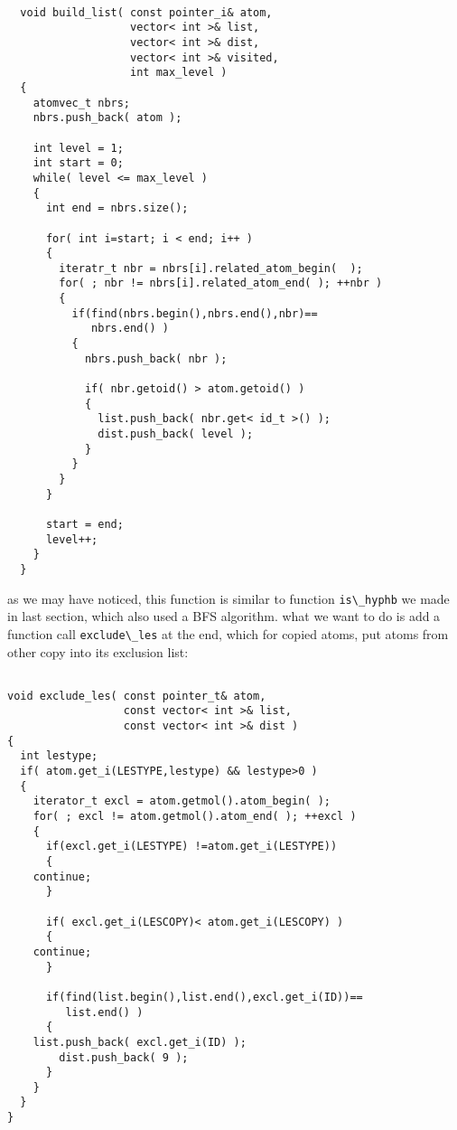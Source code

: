 \documentclass[letterpaper]{book}
\begin{document}
\begin{lstlisting}

  void build_list( const pointer_i& atom, 
                   vector< int >& list, 
                   vector< int >& dist, 
                   vector< int >& visited, 
                   int max_level )
  {
    atomvec_t nbrs;            
    nbrs.push_back( atom );
            
    int level = 1;
    int start = 0;
    while( level <= max_level )
    {
      int end = nbrs.size();
                
      for( int i=start; i < end; i++ )
      {
        iteratr_t nbr = nbrs[i].related_atom_begin(  );
        for( ; nbr != nbrs[i].related_atom_end( ); ++nbr )
        {
          if(find(nbrs.begin(),nbrs.end(),nbr)==
             nbrs.end() )
          {
            nbrs.push_back( nbr );
            
            if( nbr.getoid() > atom.getoid() )
            {
              list.push_back( nbr.get< id_t >() );
              dist.push_back( level );
            }
          }
        }
      }

      start = end;                
      level++;
    }
  }

\end{lstlisting}

as we may have noticed, this function is similar to function \lstinline$is\_hyphb$ we made in last section, 
which also used a BFS algorithm. what we want to do is add a function call \lstinline$exclude\_les$ at the 
end, which for copied atoms, put atoms from other copy into its exclusion list:

\begin{lstlisting}

void exclude_les( const pointer_t& atom, 
                  const vector< int >& list, 
                  const vector< int >& dist )
{
  int lestype;
  if( atom.get_i(LESTYPE,lestype) && lestype>0 )
  {
    iterator_t excl = atom.getmol().atom_begin( );
    for( ; excl != atom.getmol().atom_end( ); ++excl )
    {
      if(excl.get_i(LESTYPE) !=atom.get_i(LESTYPE)) 
      {
	continue;
      }
	    
      if( excl.get_i(LESCOPY)< atom.get_i(LESCOPY) )
      {
	continue;
      }

      if(find(list.begin(),list.end(),excl.get_i(ID))==
         list.end() )
      {
	list.push_back( excl.get_i(ID) );
        dist.push_back( 9 );
      }
    }
  }
}
\end{lstlisting}
\end{document}
